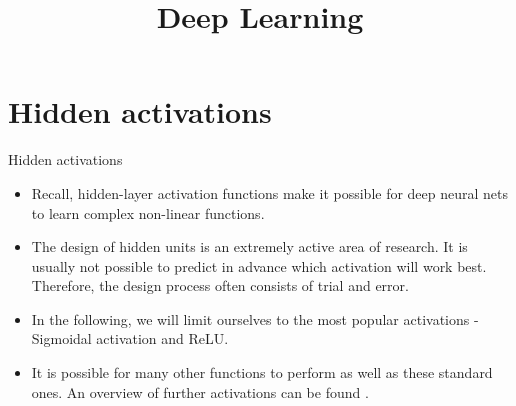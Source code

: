 




\newcommand{\titlefigure}{figure/leakyrelu_deriv.png}
\newcommand{\learninggoals}{
  \item
  \item 
  \item
}

\title{Deep Learning}
\date{}




\section{Hidden activations}

\begin{frame}{Hidden activations}
  \begin{itemize}
  \item Recall, hidden-layer activation functions make it possible for deep neural nets to learn complex non-linear functions.
  \item The design of hidden units is an extremely active area of research. 
   It is usually not possible to predict in advance which activation will work best. Therefore, the design process often consists of trial and error.
  \item In the following, we will limit ourselves to the most popular activations - Sigmoidal activation and ReLU.
  \item It is possible for many other functions to perform as well as these standard ones. An overview of further activations can be found \href{https://medium.com/@himanshuxd/activation-functions-sigmoid-relu-leaky-relu-and-softmax-basics-for-neural-networks-and-deep-8d9c70eed91e}{}.
  \end{itemize}
\end{frame}

